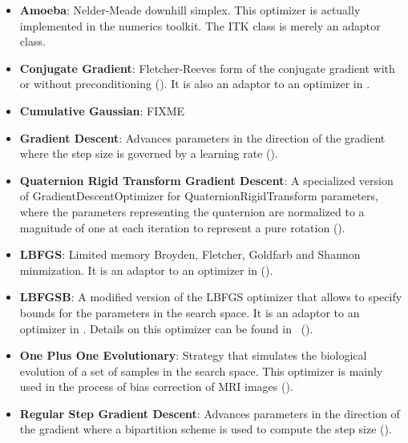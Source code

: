 \begin{itemize}

\item \textbf{Amoeba}: Nelder-Meade downhill simplex.  This optimizer is
actually implemented in the  numerics toolkit.  The ITK class
 is merely an adaptor class.

\item \textbf{Conjugate Gradient}: Fletcher-Reeves form 
of the conjugate gradient with or without preconditioning
(). It is also an adaptor to an optimizer in
.

\item \textbf{Cumulative Gaussian}: FIXME

\item \textbf{Gradient Descent}: Advances parameters in the direction of the
gradient where the step size is governed by a learning rate
(). 

\item \textbf{Quaternion Rigid Transform Gradient Descent}: A specialized
version of GradientDescentOptimizer for QuaternionRigidTransform parameters,
where the parameters representing the quaternion are normalized to a magnitude
of one at each iteration to represent a pure rotation
().

\item \textbf{LBFGS}: Limited memory Broyden, Fletcher, Goldfarb
and Shannon minmization. It is an adaptor to an optimizer in 
().

\item \textbf{LBFGSB}: A modified version of the LBFGS optimizer that allows to
specify bounds for the parameters in the search space.  It is an adaptor to an
optimizer in . Details on this optimizer can be found
in~\cite{Byrd1995,Zhu1997} ().

\item \textbf{One Plus One Evolutionary}: Strategy that simulates the
biological evolution of a set of samples in the search space. This optimizer
is mainly used in the process of bias correction of MRI images
().

\item \textbf{Regular Step Gradient Descent}: Advances parameters in the
direction of the gradient where a bipartition scheme is used to compute
the step size (). 


\end{itemize}
